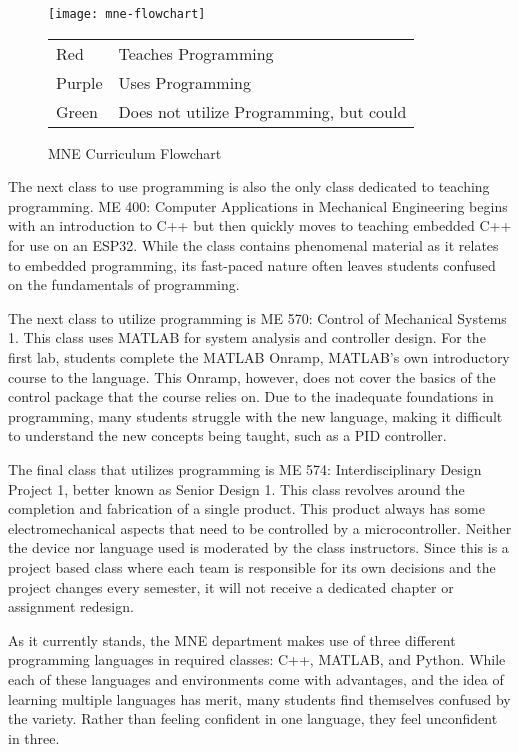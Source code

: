\begin{figure}[h]
    \texttt{[image: mne-flowchart]}
    \begin{tabular}{l@{ : }l}
        Red & Teaches Programming \\
        Purple & Uses Programming \\
        Green & Does not utilize Programming, but could \\
    \end{tabular}
    \centering
    \caption{MNE Curriculum Flowchart}
    \centering
    \label{fig:mne_flowchart}
\end{figure}

The next class to use programming is also the only class dedicated to teaching programming.
ME 400: Computer Applications in Mechanical Engineering begins with an introduction to C++
but then quickly moves to teaching embedded C++ for use on an ESP32. While the class
contains phenomenal material as it relates to embedded programming, its fast-paced nature
often leaves students confused on the fundamentals of programming. 

The next class to utilize programming is ME 570: Control of Mechanical Systems 1. This class
uses MATLAB for system analysis and controller design. For the first lab, students complete the
MATLAB Onramp, MATLAB's own introductory course to the language. This Onramp, however, does
not cover the basics of the control package that the course relies on. Due to the inadequate 
foundations in programming, many students struggle with the new language, making it difficult 
to understand the new concepts being taught, such as a PID controller.

The final class that utilizes programming is ME 574: Interdisciplinary Design Project 1, 
better known as Senior Design 1. This class revolves around the completion and fabrication
of a single product. This product always has some electromechanical aspects that need to
be controlled by a microcontroller. Neither the device nor language used is moderated by
the class instructors. Since this is a project based class where each team is responsible
for its own decisions and the project changes every semester, it will not receive a dedicated
chapter or assignment redesign.

As it currently stands, the MNE department makes use of three different programming languages
in required classes: C++, MATLAB, and Python. While each of these languages and 
environments come with advantages, and the idea of learning multiple languages has merit,
many students find themselves confused by the variety. Rather than
feeling confident in one language, they feel unconfident in three.

